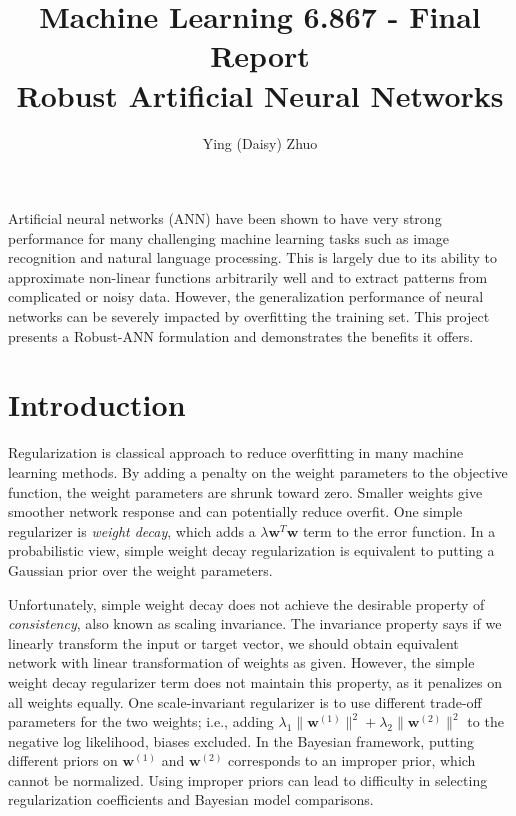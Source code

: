 \documentclass[twoside,12pt]{article}
\newcommand{\M}[1]{\boldsymbol{\mathbf{#1}}}
\begin{document}
\title{Machine Learning 6.867 - Final Report\\Robust Artificial Neural Networks}
\author{Ying (Daisy) Zhuo}

\maketitle

Artificial neural networks (ANN) have been shown to have very strong performance for many challenging machine learning tasks such as image recognition and natural language processing. This is largely due to its ability to approximate non-linear functions arbitrarily well and to extract patterns from complicated or noisy data. However, the generalization performance of neural networks can be severely impacted by overfitting the training set. This project presents a Robust-ANN formulation and demonstrates the benefits it offers. 

\section{Introduction}

Regularization is classical approach to reduce overfitting in many machine learning methods. By adding a penalty on the weight parameters to the objective function, the weight parameters are shrunk toward zero. Smaller weights give smoother network response and can potentially reduce overfit. One simple regularizer is \emph{weight decay}, which adds a $\lambda \M w ^T \M w$ term to the error function. In a probabilistic view, simple weight decay regularization is equivalent to putting a Gaussian prior over the weight parameters. 

Unfortunately, simple weight decay does not achieve the desirable property of \emph{consistency}, also known as scaling invariance. The invariance property says if we linearly transform the input or target vector, we should obtain equivalent network with linear transformation of weights as given. However, the simple weight decay regularizer term does not maintain this property, as it penalizes on all weights equally. One scale-invariant regularizer is to use different trade-off parameters for the two weights; i.e., adding $\lambda_1 \| \M w^{(1)}\|^2 + \lambda_2 \| \M w^{(2)}\|^2$ to the negative log likelihood, biases excluded. In the Bayesian framework, putting different priors on $\M w^{(1)}$ and $\M w^{(2)}$ corresponds to an improper prior, which cannot be normalized. Using improper priors can lead to difficulty in selecting regularization coefficients and Bayesian model comparisons. 
\end{document}

